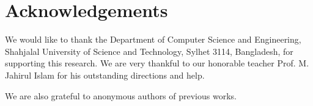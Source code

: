 \documentclass{standalone}
\begin{document}
\chapter*{Acknowledgements}
We would like to thank the Department of Computer Science and Engineering, Shahjalal University of Science and
Technology, Sylhet 3114, Bangladesh, for supporting this research. We are very thankful to our honorable teacher Prof. M. Jahirul Islam for his outstanding directions and help.  

We are also grateful to anonymous authors of previous works.
\end{document}
